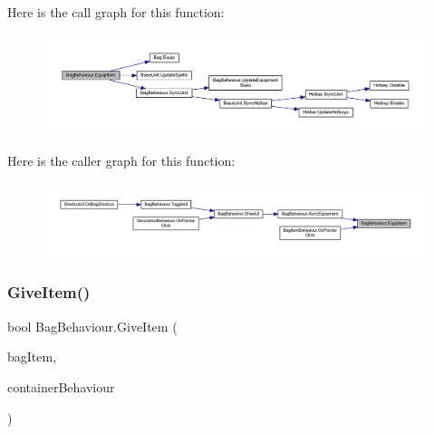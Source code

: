 Here is the call graph for this function\+:
\nopagebreak
\begin{figure}[H]
\begin{center}
\leavevmode
\includegraphics[width=350pt]{class_bag_behaviour_a472cbdd4764a3f7980c19d83b3789651_cgraph}
\end{center}
\end{figure}
Here is the caller graph for this function\+:
\nopagebreak
\begin{figure}[H]
\begin{center}
\leavevmode
\includegraphics[width=350pt]{class_bag_behaviour_a472cbdd4764a3f7980c19d83b3789651_icgraph}
\end{center}
\end{figure}
\mbox{\label{class_bag_behaviour_ac72b22f2f0340663e461c4a10f33281d}} 
\subsubsection{\texorpdfstring{GiveItem()}{GiveItem()}}
{\footnotesize\ttfamily bool Bag\+Behaviour.\+Give\+Item (\begin{DoxyParamCaption}\item[{\mbox{\hyperlink{class_bag_item_behaviour}{Bag\+Item\+Behaviour}}}]{bag\+Item,  }\item[{\mbox{\hyperlink{class_container_behaviour}{Container\+Behaviour}}}]{container\+Behaviour }\end{DoxyParamCaption})}

